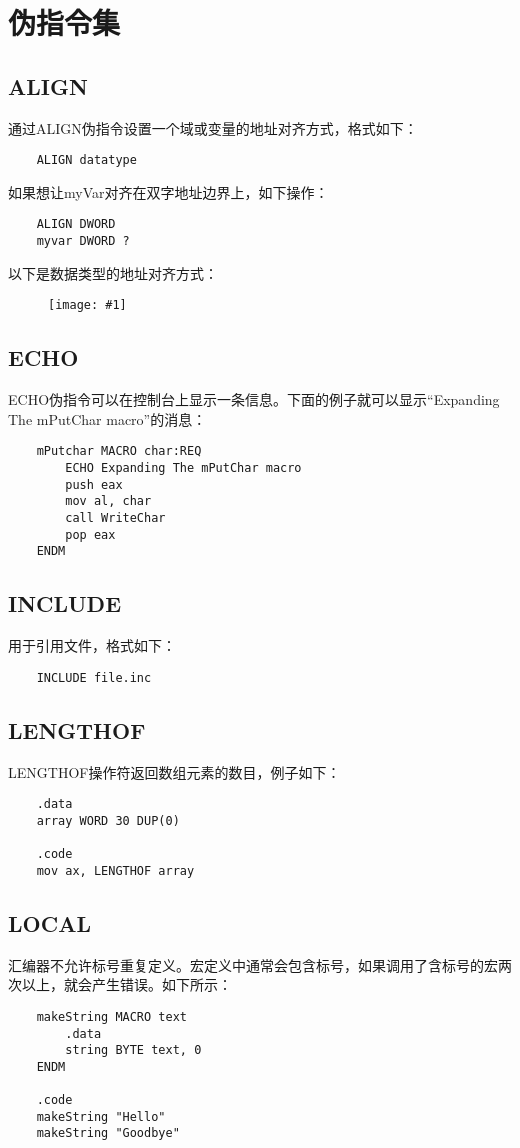 \documentclass[a4paper,left=2.5cm,right=2.5cm,11pt]{article}
\newcommand{\fic}[1]{\begin{figure}[H]
		\center
		\texttt{[image: \#1]}
	\end{figure}}
\begin{document}
\tableofcontents

\clearpage

\section{伪指令集}

\subsection{ALIGN}
	通过ALIGN伪指令设置一个域或变量的地址对齐方式，格式如下：
	\begin{lstlisting}
	ALIGN datatype
	\end{lstlisting}

	如果想让myVar对齐在双字地址边界上，如下操作：
	\begin{lstlisting}
	ALIGN DWORD
	myvar DWORD ?
	\end{lstlisting}

	以下是数据类型的地址对齐方式：
	\fic{1.png}

\subsection{ECHO}
	ECHO伪指令可以在控制台上显示一条信息。下面的例子就可以显示“Expanding The mPutChar macro”的消息：
	\begin{lstlisting}
	mPutchar MACRO char:REQ
		ECHO Expanding The mPutChar macro
		push eax
		mov al, char
		call WriteChar
		pop eax
	ENDM
	\end{lstlisting}

\subsection{INCLUDE}
	用于引用文件，格式如下：
	\begin{lstlisting}
	INCLUDE file.inc
	\end{lstlisting}

\subsection{LENGTHOF}
	LENGTHOF操作符返回数组元素的数目，例子如下：
	\begin{lstlisting}
	.data
	array WORD 30 DUP(0)

	.code
	mov ax, LENGTHOF array
	\end{lstlisting}

\subsection{LOCAL}
	汇编器不允许标号重复定义。宏定义中通常会包含标号，如果调用了含标号的宏两次以上，就会产生错误。如下所示：
	\begin{lstlisting}
	makeString MACRO text
		.data
		string BYTE text, 0
	ENDM

	.code
	makeString "Hello"
	makeString "Goodbye"
	\end{lstlisting}
\end{document}
